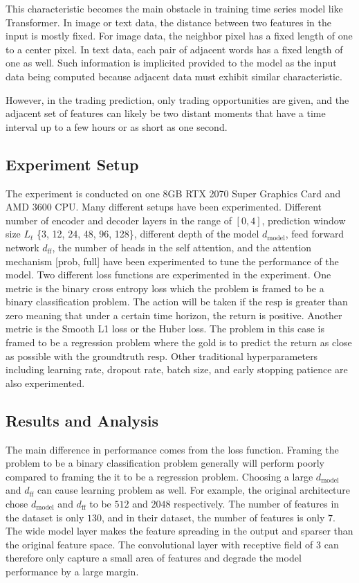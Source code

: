 \documentclass{article} %
\begin{document}
This characteristic becomes the main obstacle in training time series model like Transformer.
In image or text data, the distance between two features in the input is mostly fixed.
For image data, the neighbor pixel has a fixed length of one to a center pixel.
In text data, each pair of adjacent words has a fixed length of one as well.
Such information is implicited provided to the model as the input data being computed because adjacent data must exhibit similar characteristic.

However, in the trading prediction, only trading opportunities are given, and the adjacent set of features can likely be two distant moments that have a time interval up to a few hours or as short as one second.

\subsection{Experiment Setup}

The experiment is conducted on one 8GB RTX 2070 Super Graphics Card and AMD 3600 CPU\@.
Many different setups have been experimented.
Different number of encoder and decoder layers in the range of $[0, 4]$, prediction window size $L_{t}$ \{3, 12, 24, 48, 96, 128\}, different depth of the model $d_{\mathrm{model}}$, feed forward network $d_{\mathrm{ff}}$, the number of heads in the self attention, and the attention mechanism [prob, full] have been experimented to tune the performance of the model.
Two different loss functions are experimented in the experiment.
One metric is the binary cross entropy loss which the problem is framed to be a binary classification problem.
The action will be taken if the $\mathrm{resp}$ is greater than zero meaning that under a certain time horizon, the return is positive.
Another metric is the Smooth L1 loss or the Huber loss.
The problem in this case is framed to be a regression problem where the gold is to predict the return as close as possible with the groundtruth $\mathrm{resp}$.
Other traditional hyperparameters including learning rate, dropout rate, batch size, and early stopping patience are also experimented.

\subsection{Results and Analysis}

The main difference in performance comes from the loss function.
Framing the problem to be a binary classification problem generally will perform poorly compared to framing the it to be a regression problem.
Choosing a large $d_{\mathrm{model}}$ and $d_{\mathrm{ff}}$ can cause learning problem as well.
For example, the original architecture chose $d_{\mathrm{model}}$ and $d_{\mathrm{ff}}$ to be $512$ and $2048$ respectively.
The number of features in the dataset is only $130$, and in their dataset, the number of features is only $7$.
The wide model layer makes the feature spreading in the output and sparser than the original feature space.
The convolutional layer with receptive field of 3 can therefore only capture a small area of features and degrade the model performance by a large margin.
\end{document}
